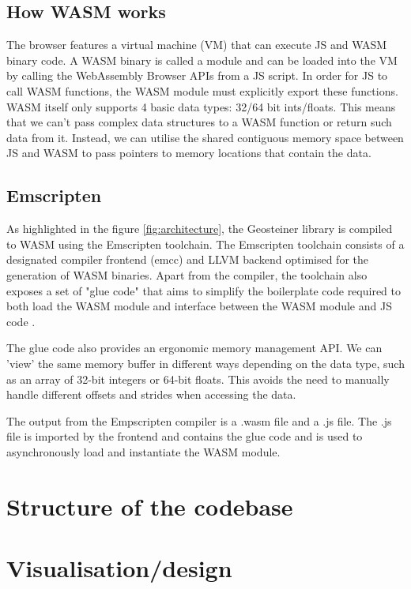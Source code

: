\documentclass{l4proj}
\begin{document}
\subsection{How WASM works}
The browser features a virtual machine (VM) that can execute JS and WASM binary code. A WASM binary is called a module and can be loaded into the VM by calling the WebAssembly Browser APIs from a JS script.
In order for JS to call WASM functions, the WASM module must explicitly export these functions. WASM itself only supports 4 basic data types: 32/64 bit ints/floats. This means that we can't pass complex data structures to a WASM function or return such data from it.
Instead, we can utilise the shared contiguous memory space between JS and WASM to pass pointers to memory locations that contain the data.

\subsection{Emscripten}

As highlighted in the figure \ref{fig:architecture}, the Geosteiner library is compiled to WASM using the Emscripten toolchain. The Emscripten toolchain consists of a designated compiler frontend (emcc) and LLVM backend optimised for the generation of WASM binaries.
Apart from the compiler, the toolchain also exposes a set of "glue code" that aims to simplify the boilerplate code required to both load the WASM module and interface between the WASM module and JS code \citep{Emscripten_tutorial}.

The glue code also provides an ergonomic memory management API. We can 'view' the same memory buffer in different ways depending on the data type, such as an array of 32-bit integers or 64-bit floats. This avoids the need to manually handle different offsets and strides when accessing the data.

The output from the Empscripten compiler is a .wasm file and a .js file. The .js file is imported by the frontend and contains the glue code and is used to asynchronously load and instantiate the WASM module.

\section{Structure of the codebase}

\section{Visualisation/design}
\end{document}
